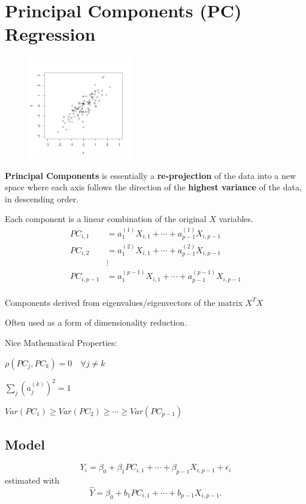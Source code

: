 \documentclass[12pt]{notes}
\begin{document}

\section{Principal Components (PC) Regression}
\begin{figure}[H]
\centering
\includegraphics[width=0.4\textwidth]{figures/module7/pc_scatter.png}
\end{figure}

\textbf{Principal Components} is essentially a \textbf{re-projection} of the data into a new space where each axis follows the direction of the \textbf{highest variance} of the data, in descending order. 
\bi
\item Each component is a linear combination of the original $X$ variables. 
\begin{align*}
PC_{i, 1} &= a_1^{(1)}X_{i, 1} + \cdots + a^{(1)}_{p-1}X_{i, p-1} \\
PC_{i, 2} &= a_1^{(2)}X_{i, 1} + \cdots + a^{(2)}_{p-1}X_{i, p-1} \\
& \vdots \\
PC_{i, p-1} &= a_1^{(p-1)}X_{i, 1} + \cdots + a^{(p-1)}_{p-1}X_{i, p-1} \\
\end{align*}
\item Components derived from eigenvalues/eigenvectors of the matrix $X^TX$
\item Often used as a form of dimensionality reduction. 
\ei

Nice Mathematical Properties:
\bi
\item $\rho(PC_j, PC_k) = 0 \quad \forall j \ne k$
\item $\sum_j\left(a_j^{(k)}\right)^2 = 1$
\item $Var(PC_1) \ge Var(PC_2) \ge \cdots \ge Var(PC_{p-1})$
\ei

\subsection{Model}
$$Y_i = \beta_0 + \beta_1PC_{i, 1} + \cdots + \beta_{p-1}X_{i, p-1} + \epsilon_i$$
estimated with 
$$\hat{Y}= \beta_0 + b_1PC_{i, 1} + \cdots + b_{p-1}X_{i, p-1}.$$
\end{document}
